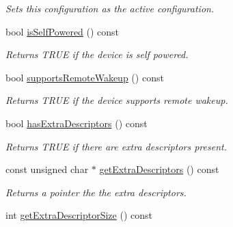 \begin{DoxyCompactItemize}
\begin{DoxyCompactList}\small\item\em Sets this configuration as the active configuration. \end{DoxyCompactList}\item 
\hypertarget{class_lib_u_s_b_1_1_configuration_impl_a307a46829bab9de77f2d8810819443fd}{bool \hyperlink{class_lib_u_s_b_1_1_configuration_impl_a307a46829bab9de77f2d8810819443fd}{is\-Self\-Powered} () const }\label{class_lib_u_s_b_1_1_configuration_impl_a307a46829bab9de77f2d8810819443fd}

\begin{DoxyCompactList}\small\item\em Returns T\-R\-U\-E if the device is self powered. \end{DoxyCompactList}\item 
\hypertarget{class_lib_u_s_b_1_1_configuration_impl_a29578c0c764baa9e04e731caae125cd2}{bool \hyperlink{class_lib_u_s_b_1_1_configuration_impl_a29578c0c764baa9e04e731caae125cd2}{supports\-Remote\-Wakeup} () const }\label{class_lib_u_s_b_1_1_configuration_impl_a29578c0c764baa9e04e731caae125cd2}

\begin{DoxyCompactList}\small\item\em Returns T\-R\-U\-E if the device supports remote wakeup. \end{DoxyCompactList}\item 
\hypertarget{class_lib_u_s_b_1_1_configuration_impl_ac7028fac9d117779600cf247b8a2c6b3}{bool \hyperlink{class_lib_u_s_b_1_1_configuration_impl_ac7028fac9d117779600cf247b8a2c6b3}{has\-Extra\-Descriptors} () const }\label{class_lib_u_s_b_1_1_configuration_impl_ac7028fac9d117779600cf247b8a2c6b3}

\begin{DoxyCompactList}\small\item\em Returns T\-R\-U\-E if there are extra descriptors present. \end{DoxyCompactList}\item 
\hypertarget{class_lib_u_s_b_1_1_configuration_impl_afcdef14d116bd97afb749a8e38234d61}{const unsigned char $\ast$ \hyperlink{class_lib_u_s_b_1_1_configuration_impl_afcdef14d116bd97afb749a8e38234d61}{get\-Extra\-Descriptors} () const }\label{class_lib_u_s_b_1_1_configuration_impl_afcdef14d116bd97afb749a8e38234d61}

\begin{DoxyCompactList}\small\item\em Returns a pointer the the extra descriptors. \end{DoxyCompactList}\item 
\hypertarget{class_lib_u_s_b_1_1_configuration_impl_a0310d0d1b7e7dde89dce64a225ec05c4}{int \hyperlink{class_lib_u_s_b_1_1_configuration_impl_a0310d0d1b7e7dde89dce64a225ec05c4}{get\-Extra\-Descriptor\-Size} () const }\label{class_lib_u_s_b_1_1_configuration_impl_a0310d0d1b7e7dde89dce64a225ec05c4}


\end{DoxyCompactItemize}
